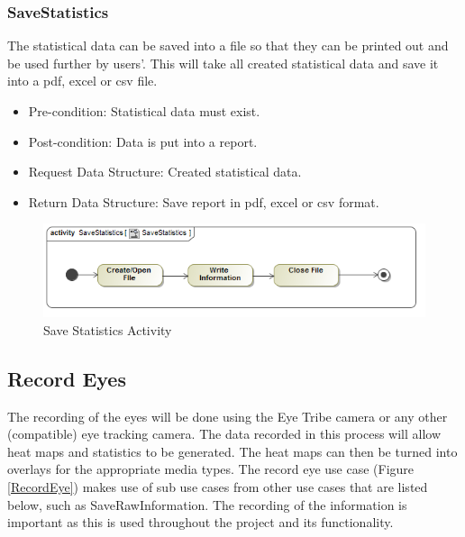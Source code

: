 		\subsubsection{SaveStatistics}
The statistical data can be saved into a file so that they can be printed out and be used further by users'. This will take all created statistical data and save it into a pdf, excel or csv file.
\begin{itemize}
\item Pre-condition: Statistical data must exist.
\item Post-condition: Data is put into a report.
\item Request Data Structure: Created statistical data.
\item Return Data Structure: Save report in pdf, excel or csv format.
\end{itemize}

\begin{figure}[!ht]
	\centering
	\includegraphics[scale=0.5,width=15cm,keepaspectratio]{Diagrams/Activity_Diagram__SaveStatistics__SaveStatistics.png}
	\caption{Save Statistics Activity}
	\end{figure}
	
\subsection{Record Eyes}
The recording of the eyes will be done using the Eye Tribe camera or any other (compatible) eye tracking camera. The data recorded in this process will allow heat maps and statistics to be generated. The heat maps can then be turned into overlays for the appropriate media types. The record eye use case (Figure \ref{RecordEye}) makes use of sub use cases from other use cases that are listed below, such as SaveRawInformation. The recording of the information is important as this is used throughout the project and its functionality.
\newline

